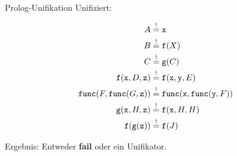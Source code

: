 \documentclass{beamer}
\begin{document}
\begin{frame}{Prolog-Unifikation}
  Unifiziert:

  \begin{align*}
    A &\stackrel{!}{=} \texttt{x} \\
    B &\stackrel{!}{=} \texttt{f}(X) \\
    C &\stackrel{!}{=} \texttt{g}(C) \\
    \texttt{f}(\texttt{x}, D, \texttt{z}) &\stackrel{!}{=} \texttt{f}(\texttt{x}, \texttt{y}, E) \\
    \texttt{func}(F, \texttt{func}(G, \texttt{z})) &\stackrel{!}{=} \texttt{func}(\texttt{x}, \texttt{func}(\texttt{y}, F)) \\
    \texttt{g}(\texttt{x}, H, \texttt{z}) &\stackrel{!}{=} \texttt{f}(\texttt{x}, H, H) \\
    \texttt{f}(\texttt{g}(\texttt{z})) &\stackrel{!}{=} \texttt{f}(J)
  \end{align*}

	Ergebnis: Entweder \textbf{fail} oder ein Unifikator.
\end{frame}

{

}
\end{document}
